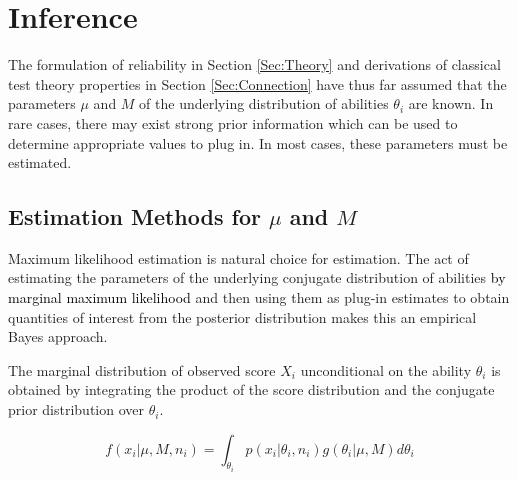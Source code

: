 \documentclass[12pt,epsfig]{article}
\newcommand{\change}[1]{\textcolor{black}{#1}}
\begin{document}

\section{Inference}
\label{Sec:Estimation}

The formulation of reliability in Section \ref{Sec:Theory} and derivations of classical test theory properties in Section \ref{Sec:Connection} have thus far assumed that the parameters $\mu$ and $M$ of the underlying distribution of abilities $\theta_i$ are known. In rare cases, there may exist strong prior information which can be used to determine appropriate values to plug in. In most cases, these parameters must be estimated. 



\subsection{Estimation Methods for $\mu$ and $M$}
\label{Subsec:EstimationTechniques}


Maximum likelihood estimation is natural choice for estimation. The act of estimating the parameters of the underlying conjugate distribution of abilities \change{by marginal maximum likelihood} and then using them as plug-in estimates to obtain quantities of interest from the posterior distribution makes this an empirical Bayes approach.

The marginal distribution of observed score $X_i$ unconditional on the ability $\theta_i$ is obtained by integrating the product of the score distribution and the conjugate prior distribution over $\theta_i$.

\begin{equation}
    f(x_i | \mu, M, n_i) = \displaystyle \int_{\theta_i} p(x_i | \theta_i, n_i) g(\theta_i | \mu, M) d\theta_i \label{Eq:MarginalDensity}
\end{equation}
\end{document}
